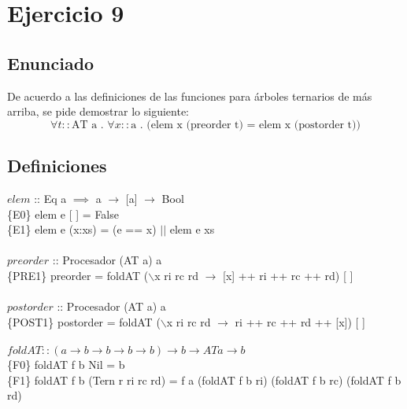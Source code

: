 \documentclass[10pt,a4paper]{article}
\begin{document}
\maketitle


\section*{Ejercicio 9}
\subsection*{Enunciado}
De acuerdo a las definiciones de las funciones para árboles ternarios de más arriba, se pide
demostrar lo siguiente:
\begin{equation*}
	\forall t :: \text{AT a . }\forall x :: \text{a . (elem x (preorder t) = elem x (postorder t))} 
\end{equation*}

\subsection*{Definiciones}
\noindent
$elem$ :: Eq a  $\implies$ a $\rightarrow$ [a] $\rightarrow$ Bool \\
\{E0\} elem e [ ] = False \\
\{E1\} elem e (x:xs) = (e == x) $||$ elem e xs \\
\\
$preorder$ :: Procesador (AT a) a \\
\{PRE1\} preorder = foldAT ($\backslash$x ri rc rd $\rightarrow$ [x] ++ ri ++ rc ++ rd) [ ]\\
\\
$postorder$ :: Procesador (AT a) a \\
\{POST1\} postorder = foldAT ($\backslash$x ri rc rd $\rightarrow$ ri ++ rc ++ rd ++ [x]) [ ]\\
\\
$foldAT :: (a \rightarrow b \rightarrow b \rightarrow b \rightarrow b) \rightarrow b \rightarrow AT a \rightarrow b $\\
\{F0\} foldAT f b Nil = b\\
\{F1\} foldAT f b (Tern r ri rc rd) = f a (foldAT f b ri) (foldAT f b rc) (foldAT f b rd)
\end{document}
